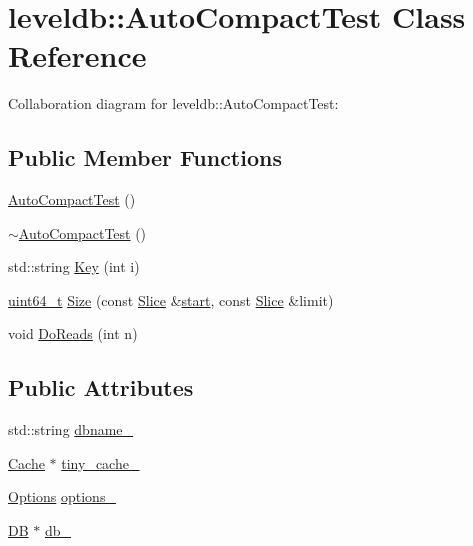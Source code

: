 \hypertarget{classleveldb_1_1_auto_compact_test}{}\section{leveldb\+:\+:Auto\+Compact\+Test Class Reference}
\label{classleveldb_1_1_auto_compact_test}


Collaboration diagram for leveldb\+:\+:Auto\+Compact\+Test\+:
\subsection*{Public Member Functions}
\begin{DoxyCompactItemize}
\item 
\hyperlink{classleveldb_1_1_auto_compact_test_a31fe0ded855f188fac1650c70849760c}{Auto\+Compact\+Test} ()
\item 
\hyperlink{classleveldb_1_1_auto_compact_test_a671873887bb99ee3731add4298a8df0b}{$\sim$\+Auto\+Compact\+Test} ()
\item 
std\+::string \hyperlink{classleveldb_1_1_auto_compact_test_a02993bed0b92d580bb0a51b92191eba9}{Key} (int i)
\item 
\hyperlink{stdint_8h_aaa5d1cd013383c889537491c3cfd9aad}{uint64\+\_\+t} \hyperlink{classleveldb_1_1_auto_compact_test_a4be489ee1b3868f61d9976935e9b2bc4}{Size} (const \hyperlink{classleveldb_1_1_slice}{Slice} \&\hyperlink{db__bench_8cc_ab376b87f96a574a793c03c53e75afec8}{start}, const \hyperlink{classleveldb_1_1_slice}{Slice} \&limit)
\item 
void \hyperlink{classleveldb_1_1_auto_compact_test_a1d1feea1aef1257e461c35eb5b51fa52}{Do\+Reads} (int n)
\end{DoxyCompactItemize}
\subsection*{Public Attributes}
\begin{DoxyCompactItemize}
\item 
std\+::string \hyperlink{classleveldb_1_1_auto_compact_test_a9caaa257e508397f94fbe646893b7b3b}{dbname\+\_\+}
\item 
\hyperlink{classleveldb_1_1_cache}{Cache} $\ast$ \hyperlink{classleveldb_1_1_auto_compact_test_a189cb5733d861b7df8c3bf945180afe5}{tiny\+\_\+cache\+\_\+}
\item 
\hyperlink{structleveldb_1_1_options}{Options} \hyperlink{classleveldb_1_1_auto_compact_test_ad7f1f35214065627e4cadd0468d22c21}{options\+\_\+}
\item 
\hyperlink{classleveldb_1_1_d_b}{D\+B} $\ast$ \hyperlink{classleveldb_1_1_auto_compact_test_a9e8d5f9bf0546b7d7fdf2128c66d8761}{db\+\_\+}
\end{DoxyCompactItemize}


